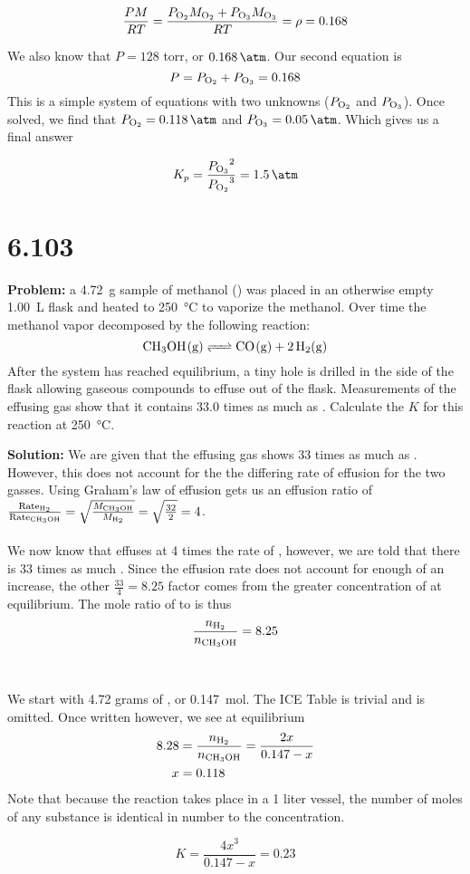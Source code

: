 \documentclass[11 pt]{article}
\begin{document}
     $$ \frac{PM}{RT} = \frac{P_{\ce{O2}}M_{\ce{O2}} + P_{\ce{O3}}M_{\ce{O3}}}{RT} = \rho = 0.168 $$
    
    We also know that $P = 128$ torr, or $\SI{.168}{\atm}$. Our second equation is $$P = P_{\ce{O2}} + P_{\ce{O3}} = 0.168$$
    This is a simple system of equations with two unknowns ($P_{\ce{O2}}$ and $P_{\ce{O3}}$). Once solved, we find that
    $P_{\ce{O2}} = \SI{0.118}{\atm}$ and $P_{\ce{O3}} = \SI{0.05}{\atm}$. Which gives us a final answer
    \begin{answerBox}
    $$K_p = \frac{{P_{\ce{O3}}}^2}{{P_{\ce{O2}}}^3} = \SI{1.5}{\per\atm}$$
    \end{answerBox}
    \newpage
    \section*{6.103}
    \begin{problemBox}
        \textbf{Problem:} a \SI{4.72}{\gram} sample of methanol () was placed in an otherwise empty \SI{1.00}{\liter} flask and heated to
        \SI{250}{\celsius} to vaporize the methanol. Over time the methanol vapor decomposed by the following reaction:
        $$\ce{CH3OH(g) <=> CO(g) + 2H2(g)}$$ After the system has reached equilibrium, a tiny hole is drilled in the side of the flask
        allowing gaseous compounds to effuse out of the flask. Measurements of the effusing gas show that it contains
        33.0 times as much  as . Calculate the $K$ for this reaction at \SI{250}{\celsius}. 
    \end{problemBox}
    \textbf{Solution:} We are given that the effusing gas shows 33 times as much  as . However, this
    does not account for the the differing rate of effusion for the two gasses. Using Graham's law of effusion gets us an
    effusion ratio of
    $\frac{\text{Rate}_{\ce{H2}}}{\text{Rate}_{\ce{CH3OH}}} = \sqrt{\frac{M_{\ce{CH3OH}}}{M_{\ce{H2}}}} = \sqrt{\frac{32}{2}} = 4$. \\ \\
    We now know that  effuses at 4 times the rate of , however, we are told that there is 33 times as much . Since the effusion
    rate does not account for enough of an increase, the other $\frac{33}{4} = 8.25$ factor comes from the greater concentration of  at equilibrium.
    The mole ratio of  to  is thus $$\frac{n_{\ce{H2}}}{n_{\ce{CH3OH}}} = 8.25 $$\\ \\
    We start with 4.72 grams of , or \SI{0.147}{\mole}. The ICE Table is trivial and is omitted. Once written however,
    we see at equilibrium 
    \begin{align*}
      8.28 &= \frac{n_{\ce{H2}}}{n_{\ce{CH3OH}}} = \frac{2x}{0.147 - x} \\
      x &= 0.118
    \end{align*}
    Note that because the reaction takes place in a 1 liter vessel, the number of moles of any substance is identical
    in number to the concentration. 
    \begin{answerBox}
        $$K = \frac{4x^3}{0.147 - x} = 0.23$$
    \end{answerBox}
    \newpage
    \newpage
\end{document}
